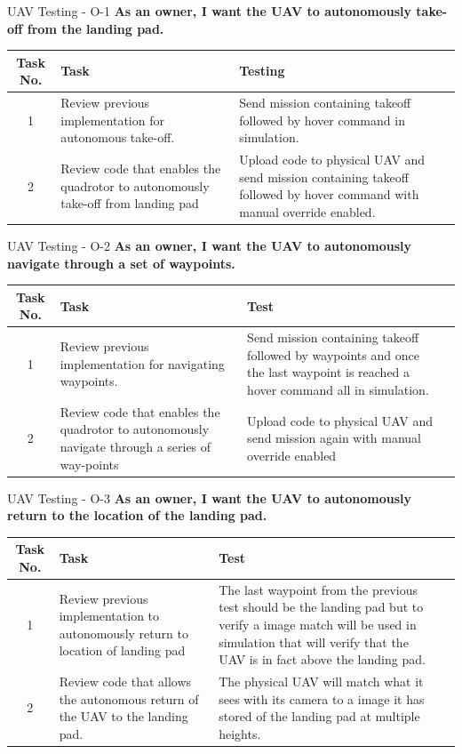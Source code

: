 \documentclass[11pt]{beamer}
\begin{document}
\begin{frame}{UAV Testing - O-1}
\textbf{As an owner, I want the UAV to autonomously take-off from the landing pad.}
\begin{tabular}{| c | >{\raggedright}m{4cm} | m{4cm} | c |}\hline
	Task No. & Task & Testing\\\hline
	1 & Review previous implementation for autonomous take-off. & Send mission containing takeoff followed by hover command in simulation.\\\hline
	2 & Review code that enables the quadrotor to autonomously take-off from landing pad & Upload code to physical UAV and send mission containing takeoff followed by hover command with manual override enabled.\\\hline
\end{tabular}
\end{frame}

\begin{frame}{UAV Testing - O-2}
\textbf{As an owner, I want the UAV to autonomously navigate through a set of waypoints.}
\begin{tabular}{| c | >{\raggedright}m{4cm} | m{4cm} | c |}\hline
	Task No. & Task & Test\\\hline
	1 & Review previous implementation for navigating waypoints. & Send mission containing takeoff followed by waypoints and once the last waypoint is reached a hover command all in simulation.\\\hline
	2 & Review code that enables the quadrotor to autonomously navigate through a series of way-points & Upload code to physical UAV and send mission again with manual override enabled\\\hline
\end{tabular}
\end{frame}
\begin{frame}{UAV Testing - O-3}
\textbf{As an owner, I want the UAV to autonomously return to the location of the landing pad.}
\begin{tabular}{| c | >{\raggedright}m{4cm} | m{4cm} | c |}\hline
	Task No. & Task & Test\\\hline
	1 & Review previous implementation to autonomously return to location of landing pad & The last waypoint from the previous test should be the landing pad but to verify a image match will be used in simulation that will verify that the UAV is in fact above the landing pad.\\\hline
	2 & Review code that allows the autonomous return of the UAV to the landing pad. & The physical UAV will match what it sees with its camera to a image it has stored of the landing pad at multiple heights.\\\hline
\end{tabular}
\end{frame}
\end{document}
